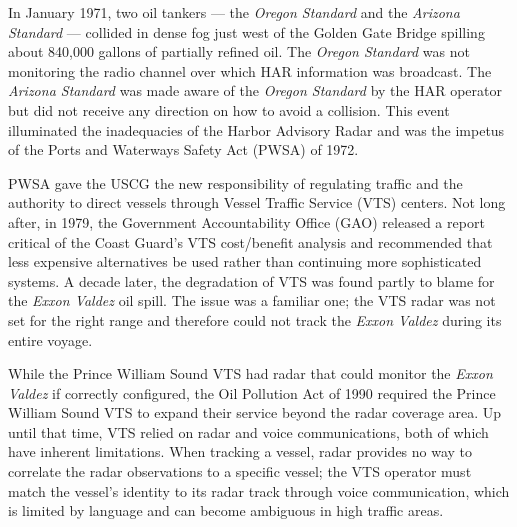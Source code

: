 \documentclass[twoside,symmetric,notoc]{tufte-book}
\begin{document}
\par{%
In January 1971, two oil tankers --- the \textit{Oregon Standard} and the \textit{Arizona Standard} --- collided in dense fog just west of the Golden Gate Bridge spilling about 840,000 gallons of partially refined oil.\cite[-0.5in]{AP} The \textit{Oregon Standard} was not monitoring the radio channel over which HAR information was broadcast. The \textit{Arizona Standard} was made aware of the \textit{Oregon Standard} by the HAR operator but did not receive any direction on how to avoid a collision.\cite[-0.1in]{NTSB_1971} This event illuminated the inadequacies of the Harbor Advisory Radar and was the impetus of the Ports and Waterways Safety Act (PWSA) of 1972.
}
\par{%
PWSA gave the USCG the new responsibility of regulating traffic and the authority to direct vessels through Vessel Traffic Service (VTS) centers.\cite{Rue} Not long after, in 1979, the Government Accountability Office (GAO) released a report critical of the Coast Guard's VTS cost/benefit analysis and recommended that less expensive alternatives be used rather than continuing more sophisticated systems.\cite{GAO_1979} A decade later, the degradation of VTS was found partly to blame for the \textit{Exxon Valdez} oil spill. The issue was a familiar one; the VTS radar was not set for the right range and therefore could not track the \textit{Exxon Valdez} during its entire voyage. 
}
\par{%
While the Prince William Sound VTS had radar that could monitor the \textit{Exxon Valdez} if correctly configured, the Oil Pollution Act of 1990 required the Prince William Sound VTS to expand their service beyond the radar coverage area. Up until that time, VTS relied on radar and voice communications, both of which have inherent limitations. When tracking a vessel, radar provides no way to correlate the radar observations to a specific vessel; the VTS operator must match the vessel's identity to its radar track through voice communication, which is limited by language and can become ambiguous in high traffic areas.\cite{Lin}
}
\end{document}

